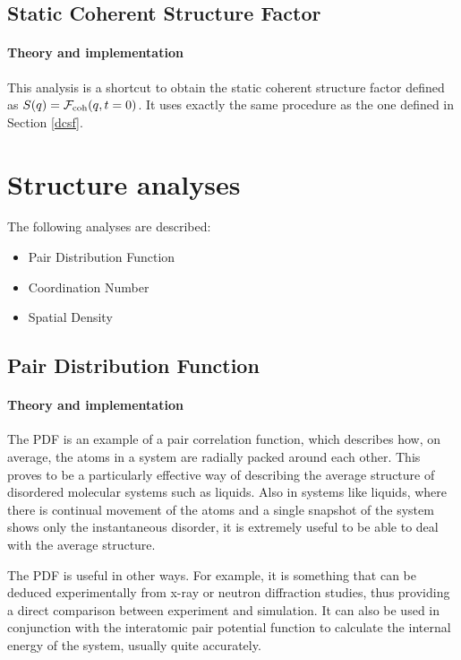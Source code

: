 \documentclass[a4paper,11pt]{article}
\begin{document}
\subsection{Static Coherent Structure Factor}
\label{scsf}
\paragraph{Theory and implementation\\}
\label{scsf_theory}
This analysis is a shortcut to obtain the static coherent structure factor defined as 
$S(q) = {\cal F}_{\mathrm{coh}}(q, t = 0)$. It uses exactly the same procedure as the one defined in Section \ref{dcsf}.

\section{Structure analyses}
\label{structure_menu}
The following analyses are described:
\begin{itemize}
\item Pair Distribution Function
\item Coordination Number
\item Spatial Density
\end{itemize}

\subsection{Pair Distribution Function}
\label{pdf}
\paragraph{Theory and implementation\\}
\label{pdf_theory}
The \gls{PDF} is an example of a pair correlation function, which describes how, on average, 
the atoms in a system are radially packed around each other. This proves to be a particularly effective way of describing 
the average structure of disordered molecular systems such as liquids. Also in systems like liquids, where there is 
continual movement of the atoms and a single snapshot of the system shows only the instantaneous disorder, it is extremely 
useful to be able to deal with the average structure.

The \gls{PDF} is useful in other ways. For example, it is something that can be deduced experimentally from x-ray or neutron 
diffraction studies, thus providing a direct comparison between experiment and simulation. It can also be used in 
conjunction with the interatomic pair potential function to calculate the internal energy of the system, usually quite 
accurately.
\end{document}
